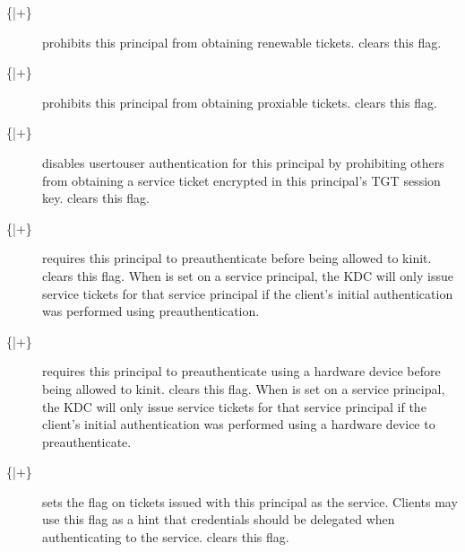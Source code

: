 \documentclass[letterpaper,10pt,english]{sphinxmanual}
\begin{document}
\begin{description}
\item[{\{\sphinxhyphen{}|+\}}] \leavevmode
\sphinxAtStartPar
{} prohibits this principal from obtaining
renewable tickets.   clears this flag.

\item[{\{\sphinxhyphen{}|+\}}] \leavevmode
\sphinxAtStartPar
{} prohibits this principal from obtaining
proxiable tickets.   clears this flag.

\item[{\{\sphinxhyphen{}|+\}}] \leavevmode
\sphinxAtStartPar
{} disables user\sphinxhyphen{}to\sphinxhyphen{}user authentication for this
principal by prohibiting others from obtaining a service ticket
encrypted in this principal’s TGT session key.
 clears this flag.

\item[{\{\sphinxhyphen{}|+\}}] \leavevmode
\sphinxAtStartPar
{} requires this principal to preauthenticate
before being allowed to kinit.   clears this
flag.  When  is set on a service principal,
the KDC will only issue service tickets for that service principal
if the client’s initial authentication was performed using
preauthentication.

\item[{\{\sphinxhyphen{}|+\}}] \leavevmode
\sphinxAtStartPar
{} requires this principal to preauthenticate
using a hardware device before being allowed to kinit.
 clears this flag.  When  is
set on a service principal, the KDC will only issue service tickets
for that service principal if the client’s initial authentication was
performed using a hardware device to preauthenticate.

\item[{\{\sphinxhyphen{}|+\}}] \leavevmode
\sphinxAtStartPar
{} sets the  flag on tickets
issued with this principal as the service.  Clients may use this
flag as a hint that credentials should be delegated when
authenticating to the service.   clears this
flag.


\end{description}
\end{document}
